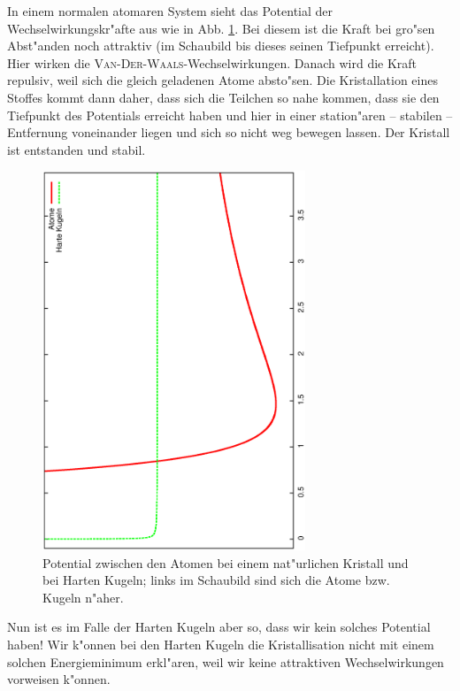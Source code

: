 \bigskip
In einem normalen atomaren System sieht das Potential
der Wechselwirkungskr"afte aus wie in
Abb. \ref{abb_kristallpotential}. Bei diesem ist die Kraft bei gro"sen
Abst"anden noch attraktiv (im Schaubild bis dieses seinen Tiefpunkt
erreicht). Hier wirken die
\textsc{Van-Der-Waals}-Wechselwirkungen. Danach wird die Kraft
repulsiv, weil sich die gleich geladenen Atome absto"sen. Die
Kristallation eines Stoffes kommt dann daher, dass sich die Teilchen
so nahe kommen, dass sie den Tiefpunkt des Potentials erreicht haben
und hier in einer station"aren -- stabilen -- Entfernung voneinander
liegen und sich so nicht weg bewegen lassen. Der Kristall ist
entstanden und stabil.
\begin{figure}
   \centering
   \includegraphics[width=0.7\textwidth,angle=-90]{bilder/kristallpot2}
   \caption[Potentiale: Atomar, Harte Kugeln]{Potential zwischen den
     Atomen bei einem nat"urlichen Kristall und bei Harten Kugeln;
     links im Schaubild sind sich die Atome bzw. Kugeln n"aher.}
   \label{abb_kristallpotential}
\end{figure}


Nun ist es im Falle der Harten Kugeln aber so, dass wir kein
solches Potential haben! Wir k"onnen bei den Harten Kugeln die
Kristallisation nicht mit einem solchen Energieminimum erkl"aren, weil
wir keine attraktiven Wechselwirkungen vorweisen k"onnen.

